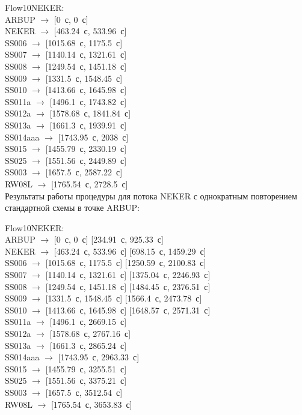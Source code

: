 \documentclass[12pt]{article}
\theoremstyle{plain}
\begin{document}
\noindent Flow10NEKER:\\
ARBUP $\rightarrow$ [0~с, 0~с]\\
NEKER $\rightarrow$ [463.24~с, 533.96~с]\\
SS006 $\rightarrow$ [1015.68~с, 1175.5~с]\\
SS007 $\rightarrow$ [1140.14~с, 1321.61~с]\\
SS008 $\rightarrow$ [1249.54~с, 1451.18~с]\\
SS009 $\rightarrow$ [1331.5~с, 1548.45~с]\\
SS010 $\rightarrow$ [1413.66~с, 1645.98~с]\\
SS011a $\rightarrow$ [1496.1~с, 1743.82~с]\\
SS012a $\rightarrow$ [1578.68~с, 1841.84~с]\\
SS013a $\rightarrow$ [1661.3~с, 1939.91~с]\\
SS014aaa $\rightarrow$ [1743.95~с, 2038~с]\\
SS015 $\rightarrow$ [1455.79~с, 2330.19~с]\\
SS025 $\rightarrow$ [1551.56~с, 2449.89~с]\\
SS003 $\rightarrow$ [1657.5~с, 2587.22~с]\\
RW08L $\rightarrow$ [1765.54~с, 2728.5~с]\\



Результаты работы процедуры для потока NEKER с однократным повторением стандартной схемы в точке ARBUP:

\noindent Flow10NEKER:\\
ARBUP $\rightarrow$ [0~с, 0~с] [234.91~с, 925.33~с]\\
NEKER $\rightarrow$ [463.24~с, 533.96~с] [698.15~с, 1459.29~с]\\
SS006 $\rightarrow$ [1015.68~с, 1175.5~с] [1250.59~с, 2100.83~с]\\
SS007 $\rightarrow$ [1140.14~с, 1321.61~с] [1375.04~с, 2246.93~с]\\
SS008 $\rightarrow$ [1249.54~с, 1451.18~с] [1484.45~с, 2376.51~с]\\
SS009 $\rightarrow$ [1331.5~с, 1548.45~с] [1566.4~с, 2473.78~с]\\
SS010 $\rightarrow$ [1413.66~с, 1645.98~с] [1648.57~с, 2571.31~с]\\
SS011a $\rightarrow$ [1496.1~с, 2669.15~с]\\
SS012a $\rightarrow$ [1578.68~с, 2767.16~с]\\
SS013a $\rightarrow$ [1661.3~с, 2865.24~с]\\
SS014aaa $\rightarrow$ [1743.95~с, 2963.33~с]\\
SS015 $\rightarrow$ [1455.79~с, 3255.51~с]\\
SS025 $\rightarrow$ [1551.56~с, 3375.21~с]\\
SS003 $\rightarrow$ [1657.5~с, 3512.54~с]\\
RW08L $\rightarrow$ [1765.54~с, 3653.83~с]\\
\end{document}
